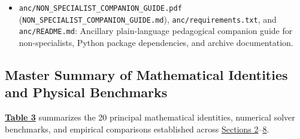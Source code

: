 \documentclass[10pt,aps,prd,twocolumn,superscriptaddress,nofootinbib,floatfix,longbibliography,showkeys]{revtex4-2}
\begin{document}
\begin{itemize}
  \item \texttt{anc/NON\_SPECIALIST\_COMPANION\_GUIDE.pdf} (\texttt{NON\_SPECIALIST\_COMPANION\_GUIDE.md}), \texttt{anc/requirements.txt}, and \texttt{anc/README.md}: Ancillary plain-language pedagogical companion guide for non-specialists, Python package dependencies, and archive documentation.

\end{itemize}

\subsection{Master Summary of Mathematical Identities and Physical Benchmarks}\label{sec:9.2}

\textbf{\hyperref[tab:table3]{Table 3}} summarizes the 20 principal mathematical identities, numerical solver benchmarks, and empirical comparisons established across \hyperref[sec:2]{Sections 2}--\hyperref[sec:8]{8}.
\end{document}
